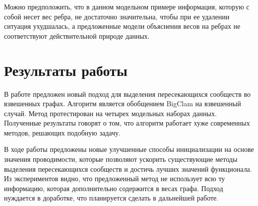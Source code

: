 \documentclass{ITaSconf}
\begin{document}
Можно предположить, что в данном модельном примере информация, которую с собой несет вес ребра, не достаточно значительна, чтобы при ее удалении ситуация ухудшалась, а предложенные модели объяснения весов на ребрах не соответствуют действительной природе данных.

\section{Результаты работы}

В работе предложен новый подход для выделения пересекающихся сообществ во взвешенных графах. 
Алгоритм является обобщением BigClam на взвешенный случай.
Метод протестирован на четырех модельных наборах данных. 
Полученные результаты говорят о том, что алгоритм работает хуже современных методов, решающих подобную задачу. 

В ходе работы предложены новые улучшенные способы инициализации на основе значения проводимости, которые позволяют ускорить существующие методы выделения пересекающихся сообществ и достичь лучших значений функционала.
Из экспериментов видно, что предложенный метод не использует всю ту информацию, которая дополнительно содержится в весах графа. 
Подход нуждается в доработке, что планируется сделать в дальнейшей работе.



\end{document}
